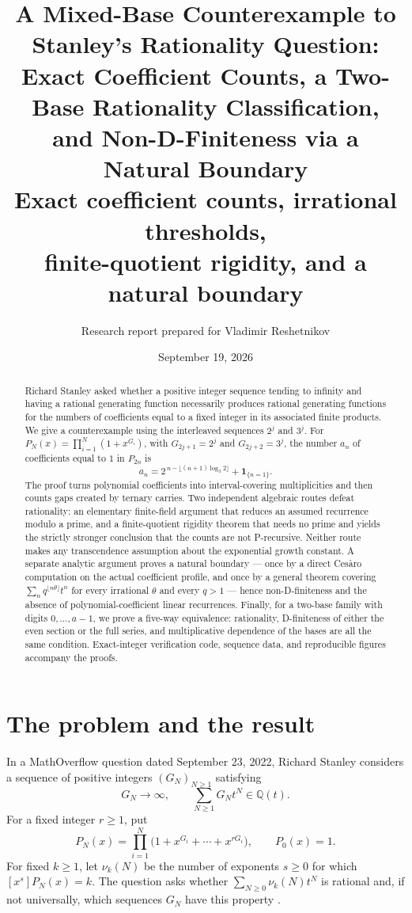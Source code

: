\documentclass[11pt,letterpaper]{article}
\title{\vspace{-1.4em}\textbf{A Mixed-Base Counterexample to
Stanley's Rationality Question:\\[0.2em]
Exact Coefficient Counts, a Two-Base Rationality Classification,\\
and Non-D-Finiteness via a Natural Boundary}\\[0.35em]
\large Exact coefficient counts, irrational thresholds,\\
finite-quotient rigidity, and a natural boundary}
\author{\normalsize Research report prepared for Vladimir Reshetnikov}
\date{\normalsize September 19, 2026}
\numberwithin{equation}{section}
\theoremstyle{definition}
\theoremstyle{remark}
\newcommand{\Q}{\mathbb{Q}}
\newcommand{\ind}[1]{\boldsymbol{1}_{\{#1\}}}
\begin{document}
\maketitle
\vspace{-1.2em}
\begin{abstract}
Richard Stanley asked whether a positive integer sequence tending to infinity
and having a rational generating function necessarily produces rational
generating functions for the numbers of coefficients equal to a fixed integer
in its associated finite products. We give a counterexample using the
interleaved sequences $2^j$ and $3^j$. For
$P_N(x)=\prod_{i=1}^N(1+x^{G_i})$, with $G_{2j+1}=2^j$ and
$G_{2j+2}=3^j$, the number $a_n$ of coefficients equal to $1$ in $P_{2n}$ is
\[
 a_n=2^{\,n-\lfloor(n+1)\log_3 2\rfloor}+\ind{n=1}.
\]
The proof turns polynomial coefficients into interval-covering
multiplicities and then counts gaps created by ternary carries.
Two independent algebraic routes defeat rationality: an elementary
finite-field argument that reduces an assumed recurrence modulo a prime,
and a finite-quotient rigidity theorem that needs no prime and yields the
strictly stronger conclusion that the counts are not P-recursive. Neither
route makes any transcendence assumption about the exponential growth
constant. A separate analytic argument proves a natural boundary --- once by
a direct Ces\`aro computation on the actual coefficient profile, and once by
a general theorem covering $\sum_n q^{\lfloor n\theta\rfloor}t^n$ for every
irrational $\theta$ and every $q>1$ --- hence non-D-finiteness and the
absence of polynomial-coefficient linear recurrences. Finally, for a two-base
family with digits $0,\ldots,a-1$, we prove a five-way equivalence:
rationality, D-finiteness of either the even section or the full series, and
multiplicative dependence of the bases are all the same condition.
Exact-integer verification code, sequence data, and reproducible figures
accompany the proofs.
\end{abstract}
\vspace{-0.6em}
\begingroup
\small
\setlength{\parskip}{0pt}
\tableofcontents
\endgroup
\clearpage

\section{The problem and the result}\label{sec:problem}

In a MathOverflow question dated September 23, 2022, Richard Stanley considers
a sequence of positive integers $(G_N)_{N\ge1}$ satisfying
\begin{equation}\label{eq:hypotheses}
 G_N\longrightarrow\infty,
 \qquad \sum_{N\ge1}G_Nt^N\in\Q(t).
\end{equation}
For a fixed integer $r\ge1$, put
\begin{equation}\label{eq:stanleyproduct}
 P_N(x)=\prod_{i=1}^N\bigl(1+x^{G_i}+\cdots+x^{rG_i}\bigr),
 \qquad P_0(x)=1.
\end{equation}
For fixed $k\ge1$, let $\nu_k(N)$ be the number of exponents $s\ge0$ for
which $[x^s]P_N(x)=k$. The question asks whether
$\sum_{N\ge0}\nu_k(N)t^N$ is rational and, if not universally, which
sequences $G_N$ have this property \cite{StanleyMO}.
\end{document}
